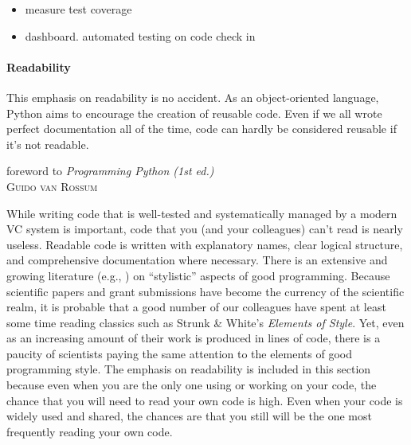 \documentclass[ChapterTOCs,krantz2]{krantz} %
\begin{document}
\begin{itemize}
\item measure test coverage
\item dashboard. automated testing on code check in
\end{itemize}

\paragraph{ {\bf Readability}}
\setlength{\epigraphrule}{0pt}
\setlength{\epigraphwidth}{.90\textwidth}
\epigraph%
{%
This emphasis on readability is no accident. As an object-oriented language,
Python aims to encourage the creation of reusable code. Even if we all wrote
perfect documentation all of the time, code can hardly be considered reusable
if it's not readable.
}%
{foreword to \textit{Programming Python (1st ed.)}\\ \textsc{Guido van Rossum} }

While writing code that is well-tested and systematically managed by a modern
VC system is important, code that you (and your colleagues) can't read is
nearly useless. Readable code is written with explanatory names, clear logical
structure, and comprehensive documentation where necessary.  There is an
extensive and growing literature (e.g., \cite{boswell2011art, Fow00,
kernighan1999practice, HT00, mcconnell2009code}) on ``stylistic'' aspects of
good programming. Because scientific papers and grant submissions have become
the currency of the scientific realm, it is probable that a good number of our
colleagues have spent at least some time reading classics such as Strunk \&
White's \emph{Elements of Style}. Yet, even as an increasing amount of their
work is produced in lines of code, there is a paucity of scientists paying the
same attention to the elements of good programming style. The emphasis on
readability is included in this section because even when you are the only one
using or working on your code, the chance that you will need to read your own
code is high. Even when your code is widely used and shared, the chances are
that you still will be the one most frequently reading your own code.
\end{document}
